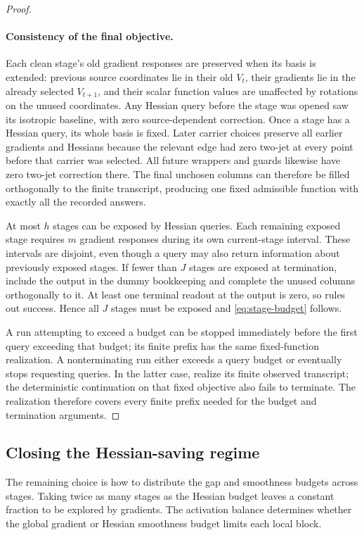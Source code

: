\documentclass[11pt]{article}
\theoremstyle{remark}
\theoremstyle{remark}
\begin{document}
\begin{proof}
\paragraph{Consistency of the final objective.}
Each clean stage's old gradient responses are preserved when its basis is extended: previous source coordinates lie in their old $V_t$, their gradients lie in the already selected $V_{t+1}$, and their scalar function values are unaffected by rotations on the unused coordinates. Any Hessian query before the stage was opened saw its isotropic baseline, with zero source-dependent correction. Once a stage has a Hessian query, its whole basis is fixed. Later carrier choices preserve all earlier gradients and Hessians because the relevant edge had zero two-jet at every point before that carrier was selected. All future wrappers and guards likewise have zero two-jet correction there. The final unchosen columns can therefore be filled orthogonally to the finite transcript, producing one fixed admissible function with exactly all the recorded answers.

At most $h$ stages can be exposed by Hessian queries. Each remaining exposed stage requires $m$ gradient responses during its own current-stage interval. These intervals are disjoint, even though a query may also return information about previously exposed stages. If fewer than $J$ stages are exposed at termination, include the output in the dummy bookkeeping and complete the unused columns orthogonally to it. At least one terminal readout at the output is zero, so  rules out success. Hence all $J$ stages must be exposed and \eqref{eq:stage-budget} follows.

A run attempting to exceed a budget can be stopped immediately before the first query exceeding that budget; its finite prefix has the same fixed-function realization. A nonterminating run either exceeds a query budget or eventually stops requesting queries. In the latter case, realize its finite observed transcript; the deterministic continuation on that fixed objective also fails to terminate. The realization therefore covers every finite prefix needed for the budget and termination arguments.
\end{proof}

\subsection{Closing the Hessian-saving regime}
\label{sec:closing-poor}
The remaining choice is how to distribute the gap and smoothness budgets across stages. Taking twice as many stages as the Hessian budget leaves a constant fraction to be explored by gradients. The activation balance determines whether the global gradient or Hessian smoothness budget limits each local block.
\end{document}
